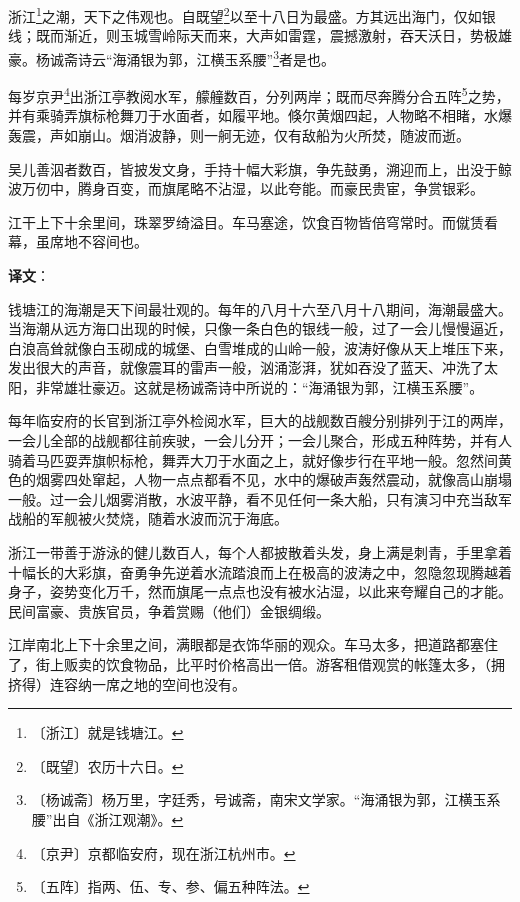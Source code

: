 \documentclass[12pt,UTF-8,openany,a4]{ctexbook}
\begin{document}
\begin{large}
    
    浙江\footnote{〔浙江〕\yiwen 就是钱塘江。}之潮，天下之伟观也。自既望\footnote{〔既望〕\yiwen 农历十六日。}以至十八日为最盛。方其远出海门，仅如银线；既而渐近，则玉城雪岭际天而来，大声如雷霆，震撼激射，吞天沃日，势极雄豪。杨诚斋诗云“海涌银为郭，江横玉系腰”\footnote{〔杨诚斋〕\yiwen 杨万里，字廷秀，号诚斋，南宋文学家。“海涌银为郭，江横玉系腰”出自《浙江观潮》。}者是也。
    
    每岁京尹\footnote{〔京尹〕\yiwen 京都临安府，现在浙江杭州市。}出浙江亭教阅水军，艨艟数百，分列两岸；既而尽奔腾分合五阵\footnote{〔五阵〕\yiwen 指两、伍、专、参、偏五种阵法。}之势，并有乘骑弄旗标枪舞刀于水面者，如履平地。倏尔黄烟四起，人物略不相睹，水爆轰震，声如崩山。烟消波静，则一舸无迹，仅有敌船为火所焚，随波而逝。
    
    吴儿善泅者数百，皆披发文身，手持十幅大彩旗，争先鼓勇，溯迎而上，出没于鲸波万仞中，腾身百变，而旗尾略不沾湿，以此夸能。而豪民贵宦，争赏银彩。
    
    江干上下十余里间，珠翠罗绮溢目。车马塞途，饮食百物皆倍穹常时。而僦赁看幕，虽席地不容间也。

\end{large}


\newpage

\begin{Large}
   \noindent \textbf{译文}：
\end{Large}

\vspace{1em}

\begin{large}\yiwen
    
    钱塘江的海潮是天下间最壮观的。每年的八月十六至八月十八期间，海潮最盛大。当海潮从远方海口出现的时候，只像一条白色的银线一般，过了一会儿慢慢逼近，白浪高耸就像白玉砌成的城堡、白雪堆成的山岭一般，波涛好像从天上堆压下来，发出很大的声音，就像震耳的雷声一般，汹涌澎湃，犹如吞没了蓝天、冲洗了太阳，非常雄壮豪迈。这就是杨诚斋诗中所说的：“海涌银为郭，江横玉系腰”。
    
    每年临安府的长官到浙江亭外检阅水军，巨大的战舰数百艘分别排列于江的两岸，一会儿全部的战舰都往前疾驶，一会儿分开；一会儿聚合，形成五种阵势，并有人骑着马匹耍弄旗帜标枪，舞弄大刀于水面之上，就好像步行在平地一般。忽然间黄色的烟雾四处窜起，人物一点点都看不见，水中的爆破声轰然震动，就像高山崩塌一般。过一会儿烟雾消散，水波平静，看不见任何一条大船，只有演习中充当敌军战船的军舰被火焚烧，随着水波而沉于海底。
    
    浙江一带善于游泳的健儿数百人，每个人都披散着头发，身上满是刺青，手里拿着十幅长的大彩旗，奋勇争先逆着水流踏浪而上在极高的波涛之中，忽隐忽现腾越着身子，姿势变化万千，然而旗尾一点点也没有被水沾湿，以此来夸耀自己的才能。民间富豪、贵族官员，争着赏赐（他们）金银绸缎。
    
    江岸南北上下十余里之间，满眼都是衣饰华丽的观众。车马太多，把道路都塞住了，街上贩卖的饮食物品，比平时价格高出一倍。游客租借观赏的帐篷太多，（拥挤得）连容纳一席之地的空间也没有。
    

\end{large}
\end{document}
